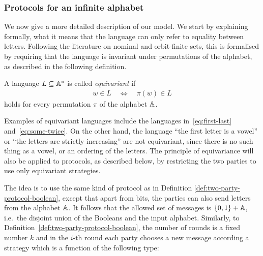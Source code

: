 


\subsubsection{Protocols for an infinite alphabet}
\label{sec:protocols-infinite-alphabet}
We now give a more detailed description of our model. We start by explaining formally, what it means that the
language can only refer to equality between letters. Following the literature on nominal and orbit-finite sets, this is formalised by requiring that the language is invariant under permutations of the alphabet, as described in the following definition.

\begin{definition} \label{def:equivariant-language}
    A language $L \subseteq \mathbb A^*$ is called \emph{equivariant} if 
    \begin{align*}
    w \in L \quad \iff \quad \pi(w) \in L
    \end{align*}
    holds for every permutation $\pi$ of the alphabet $\mathbb A$.
\end{definition}

Examples of equivariant languages include the languages in~\eqref{eq:first-last} and~\eqref{eq:some-twice}. On the other hand, the language ``the first letter is a vowel'' or ``the letters are strictly increasing'' are not equivariant, since there is no such thing as a vowel, or an ordering of the letters. The principle of equivariance will also be applied to protocols, as described below, by restricting the two parties to use only equivariant strategies.





The idea is to use the same kind of protocol as in Definition \ref{def:two-party-protocol-boolean}, except that apart from bits, the parties can also send letters from the alphabet $\mathbb A$. It follows that the allowed set of messages is 
$\{0,1\} + \mathbb A$, i.e.~the disjoint union of the Booleans and the input alphabet. Similarly, to Definition~\ref{def:two-party-protocol-boolean}, the number of rounds is a fixed number $k$ and in the $i$-th round each party chooses 
a new message according a strategy which is a function of the following type: 

